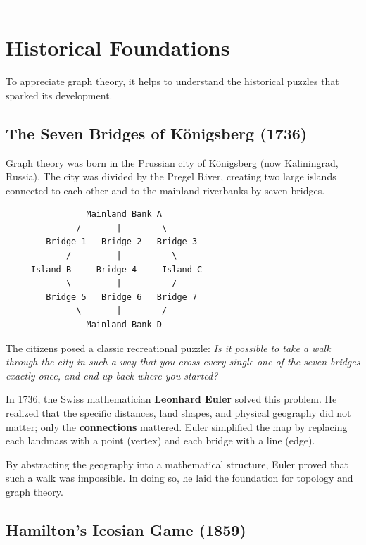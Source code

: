 \documentclass[
]{book}
\theoremstyle{definition}
\theoremstyle{definition}
\theoremstyle{definition}
\theoremstyle{definition}
\theoremstyle{remark}
\begin{document}
\begin{center}\rule{0.5\linewidth}{0.5pt}\end{center}

\section{Historical Foundations}\label{historical-foundations}

To appreciate graph theory, it helps to understand the historical puzzles that sparked its development.

\subsection{The Seven Bridges of Königsberg (1736)}\label{the-seven-bridges-of-kuxf6nigsberg-1736}

Graph theory was born in the Prussian city of Königsberg (now Kaliningrad, Russia). The city was divided by the Pregel River, creating two large islands connected to each other and to the mainland riverbanks by seven bridges.

\begin{verbatim}
                Mainland Bank A
              /       |        \
        Bridge 1   Bridge 2   Bridge 3
            /         |          \
     Island B --- Bridge 4 --- Island C
            \         |          /
        Bridge 5   Bridge 6   Bridge 7
              \       |        /
                Mainland Bank D
\end{verbatim}

The citizens posed a classic recreational puzzle: \emph{Is it possible to take a walk through the city in such a way that you cross every single one of the seven bridges exactly once, and end up back where you started?}

In 1736, the Swiss mathematician \textbf{Leonhard Euler} solved this problem. He realized that the specific distances, land shapes, and physical geography did not matter; only the \textbf{connections} mattered. Euler simplified the map by replacing each landmass with a point (vertex) and each bridge with a line (edge).

By abstracting the geography into a mathematical structure, Euler proved that such a walk was impossible. In doing so, he laid the foundation for topology and graph theory.

\subsection{Hamilton's Icosian Game (1859)}\label{hamiltons-icosian-game-1859}
\end{document}
